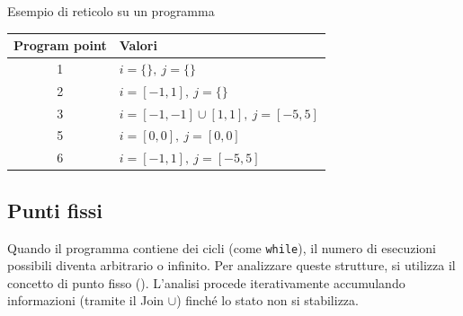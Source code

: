 \begin{esempio}{Esempio di reticolo su un programma}{}
\medskip

\begin{center}
\begin{tabular}{|c|l|}
  \hline
  \textbf{Program point} & \textbf{Valori} \\
  \hline
  \hline
  1 & $i = \{\}, \ j = \{\}$ \\
  \hline
  2 & $i = [-1, 1], \ j = \{\}$ \\
  \hline
  3 & $i = [-1, -1] \cup [1, 1], \ j = [ -5, 5 ]$ \\
  \hline
  5 & $i = [0, 0], \ j = [0, 0]$ \\
  \hline
  6 & $i = [-1, 1], \ j = [-5, 5]$ \\
  \hline
\end{tabular}
\end{center}
\end{esempio}


\subsection{Punti fissi}
Quando il programma contiene dei cicli (come \texttt{while}), il numero di
esecuzioni possibili diventa arbitrario o infinito.
Per analizzare queste strutture, si utilizza il concetto di punto fisso
().
L'analisi procede iterativamente accumulando informazioni
(tramite il Join $\cup$) finché lo stato non si stabilizza.

